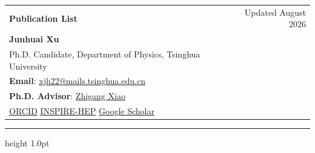 \documentclass[11pt]{article}
\begin{document}
\pagestyle{empty}
\color{ink}

\begin{tabularx}{\linewidth}{@{}Xr@{}}
  {\LARGE\bfseries Publication List} &
  {\color{muted}\normalsize Updated August 2026} \\[0.48em]
  {\Large\bfseries Junhuai Xu} &
  {} \\
  {\normalsize Ph.D. Candidate, Department of Physics, Tsinghua University} &
  {} \\
  {\normalsize \textbf{Email}: \href{mailto:xjh22@mails.tsinghua.edu.cn}{xjh22@mails.tsinghua.edu.cn}} &
  {} \\
  {\normalsize \textbf{Ph.D. Advisor}: \href{https://inspirehep.net/authors/1062622}{Zhigang Xiao}} &
  {} \\
  {\normalsize \href{https://orcid.org/0000-0001-7529-8786}{ORCID} \quad \href{https://inspirehep.net/authors/1866896}{INSPIRE-HEP} \quad \href{https://scholar.google.com/citations?user=XK-LVeIAAAAJ\&hl=en}{Google Scholar}} &
  {}
\end{tabularx}

\vspace{0.65em}
{\color{accent}\hrule height 1.0pt}
\vspace{0.9em}
\end{document}
